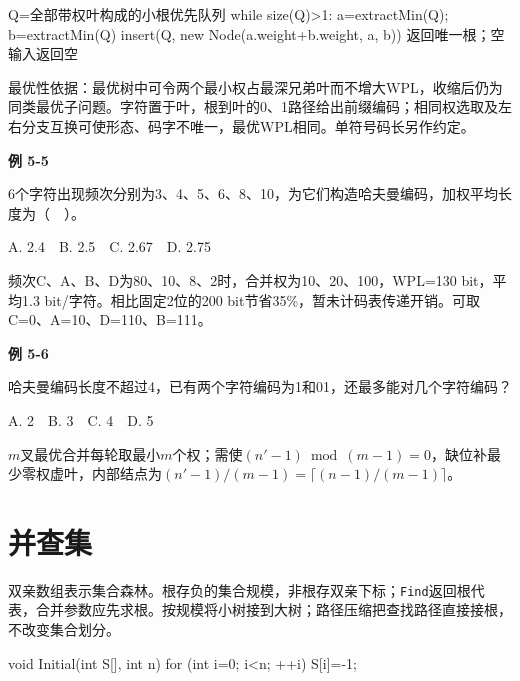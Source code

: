 \par\smallskip\noindent\begin{minipage}{\linewidth}
\begin{codeblock}[language={}]
Q=全部带权叶构成的小根优先队列
while size(Q)>1:
    a=extractMin(Q); b=extractMin(Q)
    insert(Q, new Node(a.weight+b.weight, a, b))
返回唯一根；空输入返回空
\end{codeblock}
\end{minipage}\par\smallskip

最优性依据：最优树中可令两个最小权占最深兄弟叶而不增大WPL，收缩后仍为同类最优子问题。字符置于叶，根到叶的0、1路径给出前缀编码；相同权选取及左右分支互换可使形态、码字不唯一，最优WPL相同。单符号码长另作约定。

\par\medskip{}\noindent\hypertarget{DS05-E05}{}\label{DS05-E05}\textbf{例 5-5}\par\nobreak\smallskip

6个字符出现频次分别为3、4、5、6、8、10，为它们构造哈夫曼编码，加权平均长度为（　）。

A. 2.4　B. 2.5　C. 2.67　D. 2.75

频次C、A、B、D为80、10、8、2时，合并权为10、20、100，WPL=130 bit，平均1.3 bit/字符。相比固定2位的200 bit节省35\%，暂未计码表传递开销。可取C=0、A=10、D=110、B=111。

\par\medskip{}\noindent\hypertarget{DS05-E06}{}\label{DS05-E06}\textbf{例 5-6}\par\nobreak\smallskip

哈夫曼编码长度不超过4，已有两个字符编码为1和01，还最多能对几个字符编码？

A. 2　B. 3　C. 4　D. 5

\(m\)叉最优合并每轮取最小\(m\)个权；需使\((n'-1)\bmod(m-1)=0\)，缺位补最少零权虚叶，内部结点为\((n'-1)/(m-1)=\lceil(n-1)/(m-1)\rceil\)。

\section{并查集}\label{DS05-union-find}

双亲数组表示集合森林。根存负的集合规模，非根存双亲下标；\texttt{Find}返回根代表，合并参数应先求根。按规模将小树接到大树；路径压缩把查找路径直接接根，不改变集合划分。

\par\smallskip\noindent\begin{minipage}{\linewidth}
\begin{codeblock}[language={C++}]
void Initial(int S[], int n) {
    for (int i=0; i<n; ++i) S[i]=-1;
}
\end{codeblock}
\end{minipage}\par\smallskip

